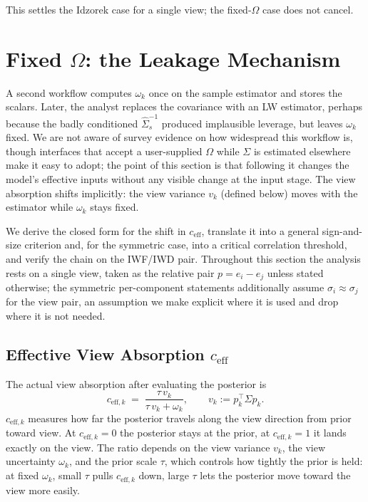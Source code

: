 \documentclass[a4paper,11pt]{article}
\theoremstyle{plain}
\theoremstyle{definition}
\newcommand{\eff}{\mathrm{eff}}
\begin{document}
This settles the Idzorek case for a single view; the fixed-$\Omega$ case
does not cancel.

\section{Fixed $\Omega$: the Leakage Mechanism}
\label{sec:fixed-omega}

A second workflow computes
$\omega_k$ once on the sample estimator and stores the scalars. Later,
the analyst replaces the covariance with an LW estimator, perhaps
because the badly conditioned $\hat\Sigma_s^{-1}$ produced implausible
leverage, but leaves $\omega_k$ fixed. We are not aware of survey evidence on how
widespread this workflow is, though interfaces that accept a
user-supplied $\Omega$ while $\Sigma$ is estimated elsewhere make it
easy to adopt; the point of this section is that following it changes
the model's effective inputs without any visible change at the input
stage. The view absorption shifts implicitly: the view variance $v_k$
(defined below) moves with the estimator while $\omega_k$ stays fixed.

We derive the closed form for the shift in $c_{\eff}$, translate it into
a general sign-and-size criterion and, for the symmetric case, into a
critical correlation threshold, and verify the chain on the IWF/IWD
pair. Throughout this section the analysis rests on a single view, taken as
the relative pair $p = e_i - e_j$ unless stated otherwise; the
symmetric per-component statements additionally assume
$\sigma_i \approx \sigma_j$ for the view pair, an assumption we make
explicit where it is used and drop where it is not needed.

\subsection{Effective View Absorption $c_{\eff}$}
\label{sec:ceff}

The actual view absorption after evaluating the posterior is
\[
  c_{\eff,k} \;=\; \frac{\tau\,v_k}{\tau\,v_k + \omega_k},
  \qquad v_k := p_k^\top\Sigma p_k.
\]
$c_{\eff,k}$ measures how far the posterior travels along the view
direction from prior toward view. At $c_{\eff,k} = 0$ the posterior
stays at the prior, at $c_{\eff,k} = 1$ it lands exactly on the view.
The ratio depends on the view variance $v_k$, the view uncertainty
$\omega_k$, and the prior scale $\tau$, which controls how tightly the
prior is held: at fixed $\omega_k$, small $\tau$ pulls $c_{\eff,k}$
down, large $\tau$ lets the posterior move toward the view more easily.
\end{document}
